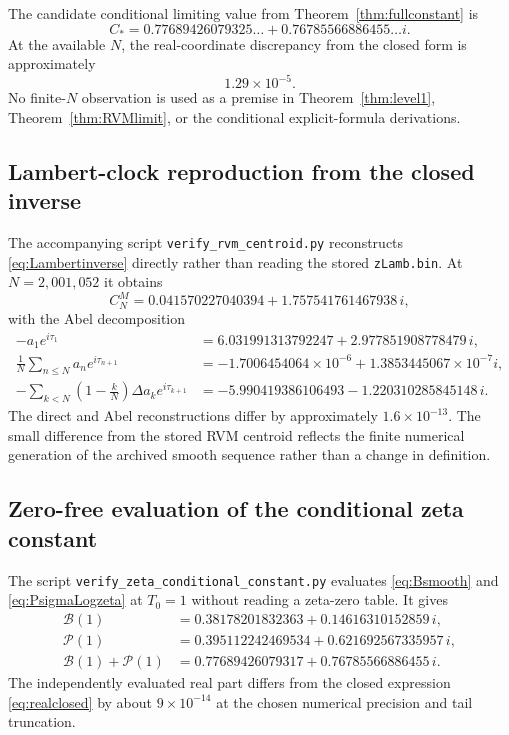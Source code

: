 \documentclass[11pt]{article}
\theoremstyle{definition}
\theoremstyle{remark}
\newcommand{\cP}{\mathcal P}
\newcommand{\cB}{\mathcal B}
\begin{document}
The candidate conditional limiting value from Theorem~\ref{thm:fullconstant} is
\[
C_*=0.77689426079325\ldots+0.76785566886455\ldots i.
\]
At the available $N$, the real-coordinate discrepancy from the closed form is approximately
\[
1.29\times10^{-5}.
\]
No finite-$N$ observation is used as a premise in Theorem~\ref{thm:level1}, Theorem~\ref{thm:RVMlimit}, or the conditional explicit-formula derivations.

\subsection{Lambert-clock reproduction from the closed inverse}
The accompanying script \texttt{verify\_rvm\_centroid.py} reconstructs \eqref{eq:Lambertinverse} directly rather than reading the stored \texttt{zLamb.bin}.  At $N=2{,}001{,}052$ it obtains
\[
C_N^M
=0.041570227040394+1.757541761467938\,i,
\]
with the Abel decomposition
\begin{align*}
-a_1e^{i\tau_1}
&=6.031991313792247+2.977851908778479\,i,\\
\frac1N\sum_{n\le N}a_ne^{i\tau_{n+1}}
&=-1.7006454064\times10^{-6}+1.3853445067\times10^{-7}i,\\
-\sum_{k<N}\left(1-\frac{k}{N}\right)\Delta a_ke^{i\tau_{k+1}}
&=-5.990419386106493-1.220310285845148\,i.
\end{align*}
The direct and Abel reconstructions differ by approximately $1.6\times10^{-13}$.  The small difference from the stored RVM centroid reflects the finite numerical generation of the archived smooth sequence rather than a change in definition.

\subsection{Zero-free evaluation of the conditional zeta constant}
The script \texttt{verify\_zeta\_conditional\_constant.py} evaluates \eqref{eq:Bsmooth} and \eqref{eq:PsigmaLogzeta} at $T_0=1$ without reading a zeta-zero table.  It gives
\begin{align*}
\cB(1)&=0.38178201832363+0.14616310152859\,i,\\
\cP(1)&=0.395112242469534+0.621692567335957\,i,\\
\cB(1)+\cP(1)&=0.77689426079317+0.76785566886455\,i.
\end{align*}
The independently evaluated real part differs from the closed expression \eqref{eq:realclosed} by about $9\times10^{-14}$ at the chosen numerical precision and tail truncation.
\end{document}
